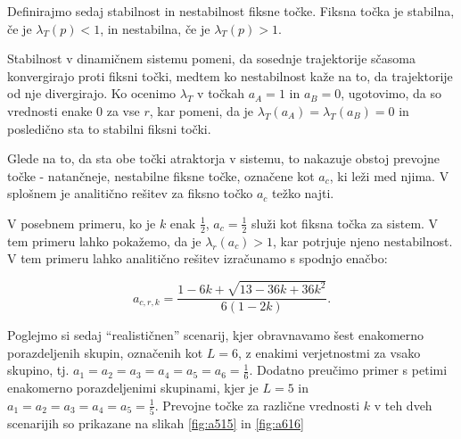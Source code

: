 \documentclass[a4paper,12pt]{article}
\begin{document}


Definirajmo sedaj stabilnost in nestabilnost fiksne točke. 
Fiksna točka je stabilna, če je $\lambda_T(p) < 1$, in nestabilna, če je $\lambda_T(p) > 1$. 

Stabilnost v dinamičnem sistemu pomeni, da sosednje trajektorije sčasoma konvergirajo proti fiksni točki, medtem ko nestabilnost kaže na to, da trajektorije od nje divergirajo. Ko ocenimo $\lambda_T$ v točkah $a_A = 1$ in $a_B = 0$, ugotovimo, da so vrednosti enake 0 za vse $r$, kar pomeni, da je $\lambda_T(a_A) = \lambda_T(a_B) = 0$ in posledično sta to stabilni fiksni točki.

Glede na to, da sta obe točki atraktorja v sistemu, to nakazuje obstoj prevojne točke - natančneje, nestabilne fiksne točke, označene kot $a_c$, ki leži med njima. V splošnem je analitično rešitev za fiksno točko $a_c$ težko najti.

V posebnem primeru, ko je $k$ enak $\frac{1}{2}$, $a_c = \frac{1}{2}$ služi kot fiksna točka za sistem. V tem primeru lahko pokažemo, da je $\lambda_r(a_c) > 1$, kar potrjuje njeno nestabilnost.
V tem primeru lahko analitično rešitev izračunamo s spodnjo enačbo:

\begin{equation}
    a_{c, r, k} = \frac{1-6k+\sqrt{13-36k+36k^2}}{6(1-2k)}.    
    \label{eq:fp5}
\end{equation}

Poglejmo si sedaj ``realističnen'' scenarij, kjer obravnavamo šest enakomerno porazdeljenih skupin, 
označenih kot $L=6$, z enakimi verjetnostmi za vsako skupino, tj. $a_1 = a_2 = a_3 = a_4 = a_5 = a_6 = \frac{1}{6}$. 
Dodatno preučimo primer s petimi enakomerno porazdeljenimi skupinami, kjer je $L=5$ in $a_1 = a_2 = a_3 = a_4 = a_5 = \frac{1}{5}$. 
Prevojne točke za različne vrednosti $k$ v teh dveh scenarijih so prikazane na slikah \ref{fig:a515} in \ref{fig:a616}
\end{document}

